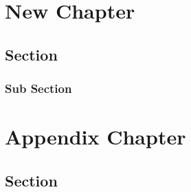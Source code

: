 \documentclass[12pt]{book}
\begin{document}
\chapter{New Chapter}

\section{Section}
\subsection{Sub Section}


\appendix

\chapter{Appendix Chapter}

\section{Section}
\end{document}
